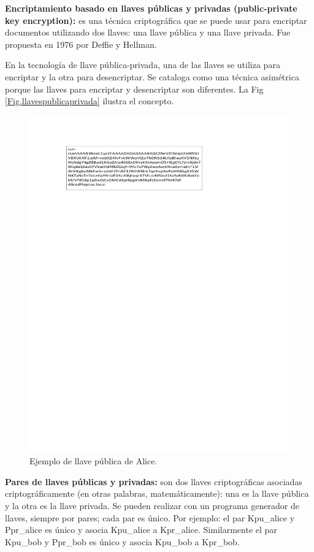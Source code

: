 \documentclass[12pt]{report} %
\begin{document}
\textbf{Encriptamiento basado en llaves públicas y privadas (public-private key encryption):} es una técnica criptográfica que se puede usar para encriptar documentos utilizando dos llaves: una llave pública y una llave privada. Fue propuesta en 1976 por Deffie y Hellman.

En la tecnología de llave pública-privada, una de las llaves se utiliza para encriptar y la otra para desencriptar. Se cataloga como una técnica asimétrica porque las llaves para encriptar y desencriptar son diferentes. La Fig \ref{Fig.llavespublicaprivada} ilustra el concepto.

\begin{figure}
\centering
\includegraphics[width=0.85\columnwidth]{imagenes/figllavepublica.pdf}
\caption{Ejemplo de llave pública de Alice.}
\label{Fig. llavepublica}
\end{figure} 

\textbf{Pares de llaves públicas y privadas:} son dos llaves criptográficas asociadas criptográficamente (en otras palabras, matemáticamente): una es la llave pública y la otra es la llave privada. Se pueden realizar con un programa generador de llaves, siempre por pares; cada par es único. Por ejemplo: el par Kpu\_alice y Ppr\_alice es único y asocia Kpu\_alice a Kpr\_alice. Similarmente el par Kpu\_bob y Ppr\_bob es único y asocia Kpu\_bob a Kpr\_bob.
\end{document}
